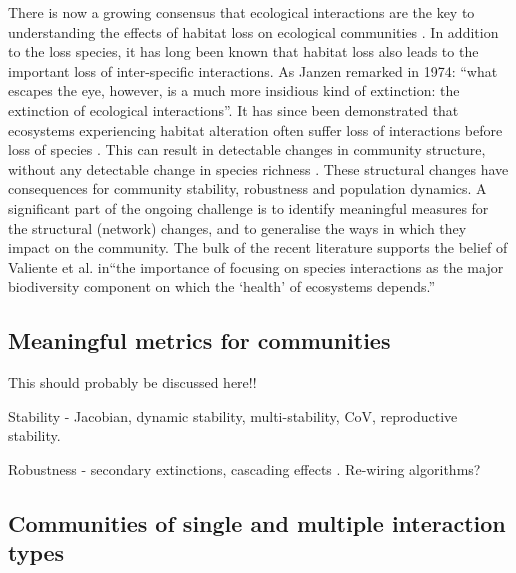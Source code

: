 \documentclass[12pt]{article}
\begin{document}



There is now a growing consensus that ecological interactions are the key to understanding the effects of habitat loss on ecological communities \cite{memmott2007conservation, hagen2012biodiversity, gonzalez2011disentangled}. In addition to the loss species, it has long been known that habitat loss also leads to the important loss of inter-specific interactions. As Janzen remarked \cite{janzen1974} in 1974: ``what escapes the eye, however, is a much more insidious kind of extinction: the extinction of ecological interactions''. It has since been demonstrated that ecosystems experiencing habitat alteration often suffer loss of interactions before loss of species \cite{valiente2015beyond, fortuna2013habitat, albrecht2007interaction}. This can result in detectable changes in community structure, without any detectable change in species richness \cite{tylianakis2007habitat}. These structural changes have consequences for community stability, robustness and population dynamics. A significant part of the ongoing challenge is to identify meaningful measures for the structural (network) changes, and to generalise the ways in which they impact on the community. The bulk of the recent literature supports the belief of Valiente et al. \cite{valiente2015beyond} in``the importance of focusing on species interactions as the major biodiversity component on which the `health' of ecosystems depends.''     

\subsection{Meaningful metrics for communities}

This should probably be discussed here!!

Stability - Jacobian, dynamic stability, multi-stability, CoV, reproductive stability. 

Robustness - secondary extinctions, cascading effects \cite{evans2013robustness}. Re-wiring algorithms?



\subsection{Communities of single and multiple interaction types} 
\end{document}
